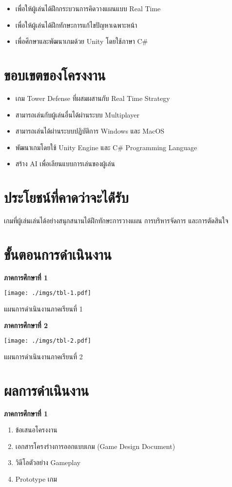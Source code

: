 \documentclass[12pt,oneside,openright,a4paper]{cpe-thai-project}
\begin{document}
\begin{itemize}
\item เพื่อให้ผู้เล่นได้ฝึกกระบวนการคิดวางแผนแบบ Real Time 
\item เพื่อให้ผู้เล่นได้ฝึกทักษะการแก้ไขปัญหาเฉพาะหน้า
\item เพื่อศึกษาและพัฒนาเกมด้วย Unity โดยใช้ภาษา C\#
\end{itemize}


\section{ขอบเขตของโครงงาน}

\begin{itemize}
\item  เกม Tower Defense ที่ผสมผสานกับ Real Time Strategy
\item  สามารถเล่นกับผู้เล่นอื่นได้ผ่านระบบ Multiplayer 
\item  สามารถเล่นได้ผ่านระบบปฏิบัติการ Windows และ MacOS
\item  พัฒนาเกมโดยใช้ Unity Engine และ C\# Programming Language 
\item  สร้าง AI เพื่อเลียนแบบการเล่นของผู้เล่น 
\end{itemize}


\section{ประโยชน์ที่คาดว่าจะได้่รับ}

เกมที่ผู้เล่นเล่นได้อย่างสนุกสนานได้ฝึกทักษะการวางแผน การบริหารจัดการ และการตัดสินใจ

\pagebreak
\section{ขั้นตอนการดำเนินงาน}
\textbf{ภาคการศึกษาที่ 1}
\begin{table}[H]
  \texttt{[image: ./imgs/tbl-1.pdf]}
  \caption{แผนการดำเนินงานภาคเรียนที่ 1}\label{tbl:tab-1}
\end{table}

\textbf{ภาคการศึกษาที่ 2}
\begin{table}[H]
  \texttt{[image: ./imgs/tbl-2.pdf]}
  \caption{แผนการดำเนินงานภาคเรียนที่ 2}\label{tbl:tab-2}
\end{table}

\pagebreak
\section{ผลการดำเนินงาน}
\textbf{ภาคการศึกษาที่ 1}
\begin{enumerate}
  \item ข้อเสนอโครงงาน
  \item เอกสารโครงร่างการออกแบบเกม (Game Design Document) 
  \item วิดีโอตัวอย่าง Gameplay
  \item Prototype เกม
  
\end{enumerate}
\end{document}
